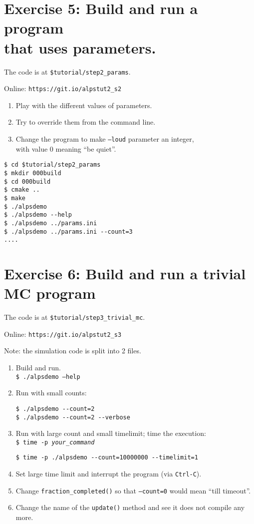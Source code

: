 \documentclass[12pt]{article}
\newcommand{\code}[1]{\texttt{#1}}
\begin{document}
\section*{Exercise 5: Build and run a program\\ that uses parameters.}

The code is at \texttt{\color{ballblue}\$tutorial/step2\_params}.

Online: \nolinkurl{https://git.io/alpstut2_s2}

\begin{enumerate}
\item Play with the different values of parameters.
\item Try to override them from the command line.
\item Change the program to make \code{--loud} parameter an integer,\\
      with value 0 meaning ``be quiet''.
\end{enumerate}

\begin{lstlisting}[emph={cd,mkdir}]
$ cd $tutorial/step2_params
$ mkdir 000build
$ cd 000build
$ cmake ..
$ make
$ ./alpsdemo
$ ./alpsdemo --help
$ ./alpsdemo ../params.ini
$ ./alpsdemo ../params.ini --count=3
....
\end{lstlisting}

\section*{Exercise 6: Build and run a trivial MC program}

The code is at \texttt{\color{ballblue}\$tutorial/step3\_trivial\_mc}.

Online: \nolinkurl{https://git.io/alpstut2_s3}

Note: the simulation code is split into 2 files.

\begin{enumerate}
\item Build and run.\\
\code{\$ ./alpsdemo --help}
\item Run with small counts:
\begin{lstlisting}[]
$ ./alpsdemo --count=2
$ ./alpsdemo --count=2 --verbose
\end{lstlisting}
\item Run with large count and small timelimit; time the execution:\\
\code{\$ time -p \emph{your\_command}}
\begin{lstlisting}[emph={time}]
$ time -p ./alpsdemo --count=10000000 --timelimit=1
\end{lstlisting}%
\item Set large time limit and interrupt the program (via \code{Ctrl-C}).
\item Change \code{fraction\_completed()} so that \code{--count=0} would mean ``till timeout''.
\item Change the name of the \code{update()} method and see it does not compile any more.
\end{enumerate}
\end{document}
